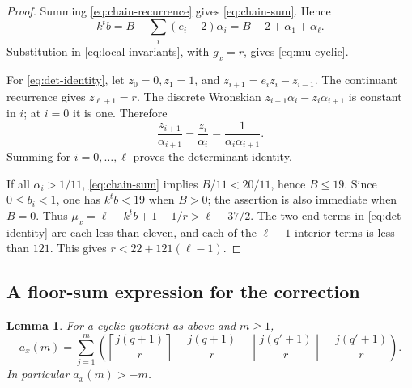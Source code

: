\documentclass[12pt,a4paper]{article}
\numberwithin{equation}{section}
\newtheorem{lemma}[theorem]{Lemma}
\theoremstyle{definition}
\newcommand{\ceil}[1]{\left\lceil#1\right\rceil}
\newcommand{\floor}[1]{\left\lfloor#1\right\rfloor}
\begin{document}
\begin{proof}
Summing \eqref{eq:chain-recurrence} gives
\eqref{eq:chain-sum}. Hence
\[
 k^tb=B-\sum_i(e_i-2)\alpha_i
     =B-2+\alpha_1+\alpha_\ell.
\]
Substitution in \eqref{eq:local-invariants}, with \(g_x=r\), gives
\eqref{eq:mu-cyclic}.

For \eqref{eq:det-identity}, let \(z_0=0,z_1=1\), and
\(z_{i+1}=e_i z_i-z_{i-1}\). The continuant recurrence gives
\(z_{\ell+1}=r\).
The discrete Wronskian
\(z_{i+1}\alpha_i-z_i\alpha_{i+1}\) is constant in \(i\);
at \(i=0\) it is one. Therefore
\[
 \frac{z_{i+1}}{\alpha_{i+1}}-\frac{z_i}{\alpha_i}
                         =\frac1{\alpha_i\alpha_{i+1}}.
\]
Summing for \(i=0,\ldots,\ell\) proves the determinant identity.

If all \(\alpha_i>1/11\), \eqref{eq:chain-sum} implies
\(B/11<20/11\), hence \(B\leq19\).
Since \(0\leq b_i<1\), one has \(k^tb<19\) when \(B>0\);
the assertion is also immediate when \(B=0\). Thus
\(\mu_x=\ell-k^tb+1-1/r>\ell-37/2\).
The two end terms in \eqref{eq:det-identity} are each less than
eleven, and each of the \(\ell-1\) interior terms is less than \(121\).
This gives \(r<22+121(\ell-1)\).
\end{proof}

\subsection{A floor-sum expression for the correction}

\begin{lemma}\label{lem:cyclic-correction}
For a cyclic quotient as above and \(m\geq1\),
\begin{equation}\label{eq:floor-correction}
 a_x(m)=\sum_{j=1}^m
 \left(
  \ceil{\frac{j(q+1)}r}-\frac{j(q+1)}r
  +\floor{\frac{j(q'+1)}r}-\frac{j(q'+1)}r
 \right).
\end{equation}
In particular \(a_x(m)>-m\).
\end{lemma}
\end{document}
